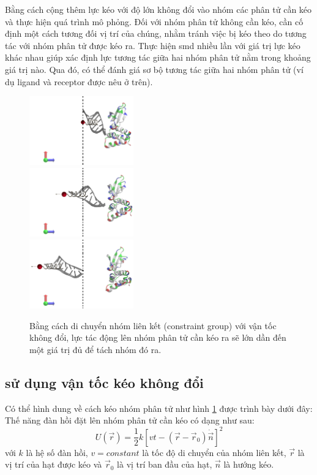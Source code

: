 \documentclass[12pt,a4paper,reqno, oneside]{book}
\begin{document}
	Bằng cách cộng thêm lực kéo với độ lớn không đổi vào nhóm các phân tử cần kéo và thực hiện quá trình mô phỏng. Đối với nhóm phân tử không cần kéo, cần cố định một cách tương đối vị trí của chúng, nhằm tránh việc bị kéo theo do tương tác với nhóm phân tử được kéo ra. Thực hiện \gls{smd} nhiều lần với giá trị lực kéo khác nhau giúp xác định lực tương tác giữa hai nhóm phân tử nằm trong khoảng giá trị nào. Qua đó, có thể đánh giá sơ bộ tương tác giữa hai nhóm phân tử (ví dụ \gls{ligand} và \gls{receptor} được nêu ở trên).
	\begin{figure}
	\vspace{-30pt}
	\begin{center}
	\includegraphics[width=0.4\textwidth,natwidth=610,natheight=642]{smd-1}\\
	\includegraphics[width=0.4\textwidth,natwidth=610,natheight=642]{smd-2}\\
	\includegraphics[width=0.4\textwidth,natwidth=610,natheight=642]{smd-3}
	\end{center}
	\vspace{-5pt}
	\caption{Bằng cách di chuyển nhóm liên kết (constraint group) với vận tốc không đổi, lực tác động lên nhóm phân tử cần kéo ra sẽ lớn dần đến một giá trị đủ để tách nhóm đó ra.}
	\label{fig:smd}
	\end{figure}
	\subsection{ sử dụng vận tốc kéo không đổi}
	Có thể hình dung về cách kéo nhóm phân tử như hình \ref{fig:smd} được trình bày dưới đây:
	Thế năng đàn hồi đặt lên nhóm phân tử cần kéo có dạng như sau:
	\begin{equation}
	U\left(\vec{r}\right) = \dfrac{1}{2} k\left[ vt - \left( \vec{r}-\vec{r}_{0} \right) \dot\vec{n} \right]^{2}
	\end{equation}
	với $k$ là hệ số đàn hồi, $v=constant$ là tốc độ di chuyển của nhóm liên kết, $\vec{r}$ là vị trí của hạt được kéo và $\vec{r}_{0}$ là vị trí ban đầu của hạt, $\vec{n}$ là hướng kéo.
	
\end{document}
